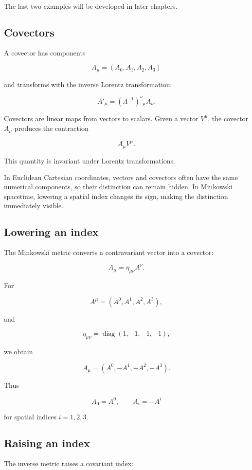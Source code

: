 The last two examples will be developed in later chapters.

\subsection{Covectors}

A covector has components

\[
A_{\mu}
=
(A_{0},A_{1},A_{2},A_{3})
\]

and transforms with the inverse Lorentz transformation:

\[
\boxed{
A'_{\mu}
=
(\Lambda^{-1})^{\nu}{}_{\mu}A_{\nu}
}.
\]

Covectors are linear maps from vectors to scalars. Given a vector \(V^{\mu}\), the covector \(A_{\mu}\) produces the contraction

\[
A_{\mu}V^{\mu}.
\]

This quantity is invariant under Lorentz transformations.

In Euclidean Cartesian coordinates, vectors and covectors often have the same numerical components, so their distinction can remain hidden. In Minkowski spacetime, lowering a spatial index changes its sign, making the distinction immediately visible.

\subsection{Lowering an index}

The Minkowski metric converts a contravariant vector into a covector:

\[
\boxed{
A_{\mu}
=
\eta_{\mu\nu}A^{\nu}
}.
\]

For

\[
A^{\mu}
=
(A^{0},A^{1},A^{2},A^{3}),
\]

and

\[
\eta_{\mu\nu}
=
\operatorname{diag}(1,-1,-1,-1),
\]

we obtain

\[
\boxed{
A_{\mu}
=
(A^{0},-A^{1},-A^{2},-A^{3})
}.
\]

Thus

\[
A_{0}=A^{0},
\qquad
A_{i}=-A^{i}
\]

for spatial indices \(i=1,2,3\).

\subsection{Raising an index}

The inverse metric raises a covariant index:

